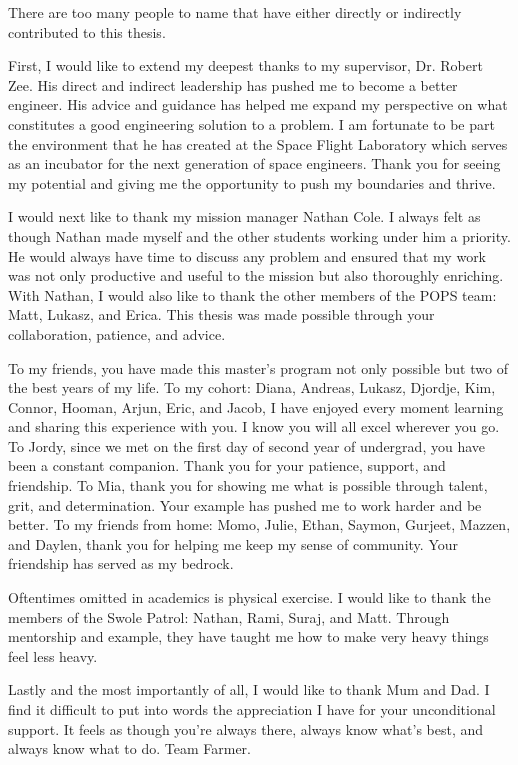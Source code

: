 There are too many people to name that have either directly or indirectly
contributed to this thesis. 

First, I would like to extend my deepest thanks to my supervisor, Dr. Robert
Zee. His direct and indirect leadership has pushed me to become a better
engineer. His advice and guidance has helped me expand my perspective on what
constitutes a good engineering solution to a problem. I am fortunate to be part
the environment that he has created at the Space Flight Laboratory which serves
as an incubator for the next generation of space engineers.  Thank you for
seeing my potential and giving me the opportunity to push my boundaries and
thrive.

I would next like to thank my mission manager Nathan Cole. I always felt as
though Nathan made myself and the other students working under him a priority.
He would always have time to discuss any problem and ensured that my work was
not only productive and useful to the mission but also thoroughly enriching.
With Nathan, I would also like to thank the other members of the POPS team:
Matt, Lukasz, and Erica. This thesis was made possible through your
collaboration, patience, and advice.  

To my friends, you have made this master's program not only possible but two of
the best years of my life. To my cohort: Diana, Andreas, Lukasz, Djordje, Kim,
Connor, Hooman, Arjun, Eric, and Jacob, I have enjoyed every moment learning
and sharing this experience with you. I know you will all excel wherever you
go. To Jordy, since we met on the first day of second year of undergrad, you
have been a constant companion. Thank you for your patience, support, and
friendship. To Mia, thank you for showing me what is possible through talent,
grit, and determination. Your example has pushed me to work harder and be
better.  To my friends from home: Momo, Julie, Ethan, Saymon, Gurjeet, Mazzen,
and Daylen, thank you for helping me keep my sense of community. Your
friendship has served as my bedrock. 

Oftentimes omitted in academics is physical exercise. I would like to thank the
members of the Swole Patrol: Nathan, Rami, Suraj, and Matt. Through mentorship
and example, they have taught me how to make very heavy things feel less heavy.

Lastly and the most importantly of all, I would like to thank Mum and Dad. I
find it difficult to put into words the appreciation I have for your
unconditional support. It feels as though you're always there, always know
what's best, and always know what to do. Team Farmer.

